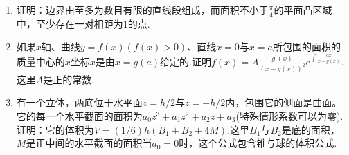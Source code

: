 \begin{enumerate}
	\item 证明：边界由至多为数目有限的直线段组成，而面积不小于$\frac{\pi}{4}$的平面凸区域中，至少存在一对相距为1的点.
	
	\item 如果$x$轴、曲线$y=f(x)(f(x)>0)$、直线$x=0$与$x=a$所包围的面积的质量中心的$x$坐标$\tilde{x}$是由$\tilde{x}=g(a)$给定的.证明$f(x)=A \frac{g^{\prime}(x)}{(x-g(x))^{2}} \mathrm{e}^{\int \frac{\mathrm{d} x}{x-g(x)}}$.这里$A$是正的常数.
	\item 有一个立体，两底位于水平面$z=h/2$与$z=-h/2$内，包围它的侧面是曲面。它的每一个水平截面的面积为$a_{0} z^{3}+a_{1} z^{2}+a_{2} z+a_{3}$(特殊情形系数可以为零).证明：它的体积为$V=(1 / 6) h\left(B_{1}+B_{2}+4 M\right)$.这里$B_{1}$与$B_{2}$是底的面积，$M$是正中间的水平截面的面积当$a_{0}=0$时，这个公式包含锥与球的体积公式.
\end{enumerate}